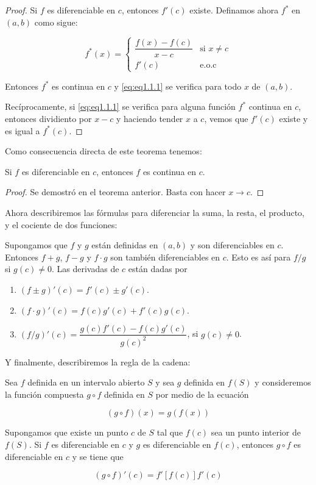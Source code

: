 \begin{proof}
    Si $f$ es diferenciable en $c$, entonces $f'(c)$ existe. Definamos ahora $f^*$  en $(a, b)$ como sigue:
    
    \[
    f^*(x) = 
    \begin{cases}
        \dfrac{f(x) - f(c)}{x-c} & \text{si $x \neq c$} \\
        f'(c) & \text{e.o.c}
    \end{cases}
    \]
    
    Entonces $f^*$ es continua en $c$ y \ref{eq:eq1.1.1} se verifica para todo $x$ de $(a, b)$.
    
    Recíprocamente, si \ref{eq:eq1.1.1} se verifica para alguna función $f^*$ continua en $c$, entonces dividiento por $x-c$ y haciendo tender $x$ a $c$, vemos que $f'(c)$ existe y es igual a $f^*(c)$.
\end{proof}

Como consecuencia directa de este teorema tenemos:

\begin{teo}
    Si $f$ es diferenciable en $c$, entonces $f$ es continua en $c$.
\end{teo}

\begin{proof}
    Se demostró en el teorema anterior. Basta con hacer $x \to c$.
\end{proof}

Ahora describiremos las fórmulas para diferenciar la suma, la resta, el producto, y el cociente de dos funciones:

\begin{teo}
    Supongamos que $f$ y $g$ están definidas en $(a, b)$ y son diferenciables en $c$. Entonces $f+g$, $f-g$ y $f \cdot g$ son también diferenciables en $c$. Esto es así para $f / g$ si $g(c) \neq 0$. Las derivadas de $c$ están dadas por
    
    \begin{enumerate}
        \item $(f \pm g)'(c) = f'(c) \pm g'(c)$.
        \item $(f \cdot g)'(c) = f(c)g'(c) + f'(c)g(c)$.
        \item $(f/g)'(c) = \dfrac{g(c)f'(c) - f(c)g'(c)}{g(c)^2}$, si $g(c) \neq 0$.
    \end{enumerate}
\end{teo}

Y finalmente, describiremos la regla de la cadena:

\begin{teo}
    Sea $f$ definida en un intervalo abierto $S$ y sea $g$ definida en $f(S)$ y consideremos la función compuesta $g \circ f$ definida en $S$ por medio de la ecuación
    
    \[
    (g \circ f)(x) = g(f(x))
    \]
    
    Supongamos que existe un punto $c$ de $S$ tal que $f(c)$ sea un punto interior de $f(S)$. Si $f$ es diferenciable en $c$ y $g$ es diferenciable en $f(c)$, entonces $g \circ f$ es diferenciable en $c$ y se tiene que
    
    \[
    (g \circ f)'(c) = f'[f(c)]f'(c)
    \]
\end{teo}

